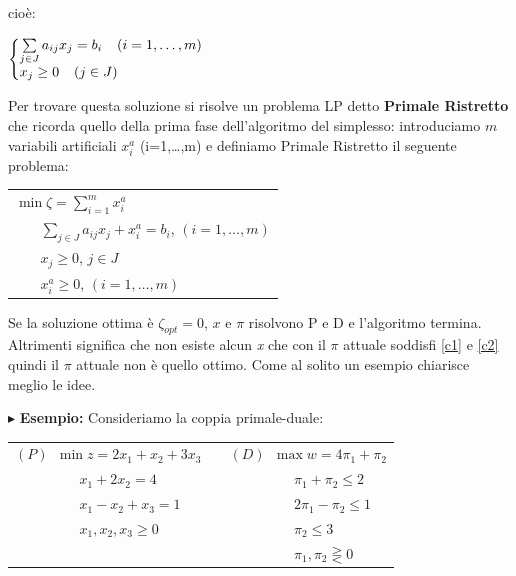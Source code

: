 \documentclass[11pt]{book}
\makeatletter
\newenvironment{sistema}%
{\left\lbrace\begin{array}{@{}l@{}}}%
{\end{array}\right.}
\makeatother
\begin{document}
cio\`e:

\begin{center}
$\begin{sistema}
\sum\limits_{j \in J} a_{ij}x_j = b_i\phantom{aa}(i=1,\dots,m)\\
x_j \geq 0\phantom{aa}(j \in J)
\end{sistema}$
\end{center}

Per trovare questa soluzione si risolve un problema LP detto {\bf
  Primale Ristretto} che ricorda quello della prima fase
dell'algoritmo del simplesso: introduciamo $m$ variabili artificiali
$x_i^a$ (i=1,\dots,m) e definiamo Primale Ristretto il seguente
problema:

\vspace{11pt}
\begin{center}
\begin{tabular}{l}
$\min \zeta = \sum\limits_{i=1}^m x_i^a$\\
$\phantom{min}\sum\limits_{j\in J} a_{ij}x_{j} + x_i^a = b_i$,
  $(i=1,\dots,m)$\\
$\phantom{min}x_j \geq 0$, $j \in J$\\
$\phantom{min}x_i^a \geq 0$, $(i=1,\dots,m)$\\
\end{tabular}
\end{center}
\vspace{11pt}

Se la soluzione ottima \`e $\zeta_{opt} = 0$, $x$ e $\pi$ risolvono P
e D e l'algoritmo termina. Altrimenti significa che non esiste alcun
{\em x} che con il $\pi$ attuale soddisfi \ref{c1} e \ref{c2} quindi
il $\pi$ attuale non \`e quello ottimo. Come al solito un esempio
chiarisce meglio le idee.

\vspace{11pt}$\blacktriangleright$ {\bf Esempio:} Consideriamo la
coppia primale-duale:

\begin{center}
\begin{tabular}{lp{3cm}l}
$(P)\phantom{a}\min z = 2x_1 + x_2 + 3x_3$ && $(D)\phantom{a}\max w =
  4\pi_1+\pi_2$\\
$\phantom{(p)mina}x_1 + 2x_2 = 4$ && $\phantom{(p)mina}\pi_1 + \pi_2 \leq 2$\\
$\phantom{(p)mina}x_1 - x_2 + x_3 = 1$ && $\phantom{(p)mina}2\pi_1 - \pi_2 \leq 1$ \\
$\phantom{(p)mina}x_1,x_2,x_3 \geq 0$ && $\phantom{(p)mina}\pi_2 \leq 3$\\
&& $\phantom{(p)mina}\pi_1, \pi_2 \gtreqless 0$
\end{tabular}
\end{center}
\end{document}
